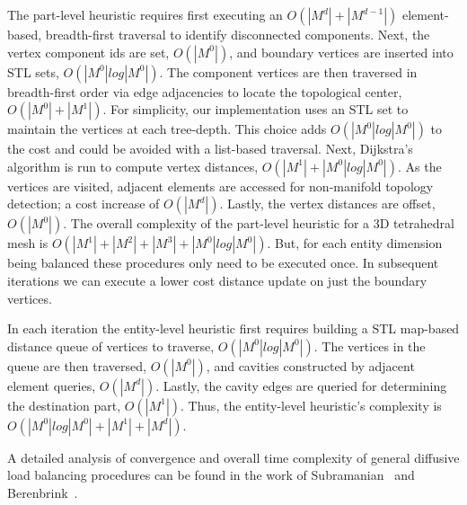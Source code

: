 The part-level heuristic requires first executing an $O(|M^d|+|M^{d-1}|)$
element-based, breadth-first traversal to identify disconnected components.
Next, the vertex component ids are set, $O(|M^0|)$, and boundary vertices
are inserted into STL sets, $O(|M^0|log|M^0|)$.
The component vertices are then traversed in breadth-first order via edge
adjacencies to locate the topological center, $O(|M^0|+|M^{1}|)$.
For simplicity, our implementation uses an STL set to maintain the vertices at
each tree-depth.
This choice adds $O(|M^0|log|M^0|)$ to the cost and could be avoided with a
list-based traversal.
Next, Dijkstra's algorithm is run to compute vertex distances,
$O(|M^1|+|M^0|log|M^0|)$.
As the vertices are visited, adjacent elements are accessed for non-manifold
topology detection; a cost increase of $O(|M^d|)$.
Lastly, the vertex distances are offset, $O(|M^0|)$.
The overall complexity of the part-level heuristic for a 3D tetrahedral mesh is
$O(|M^1| + |M^2| + |M^3| + |M^0|log|M^0|)$.
But, for each entity dimension being balanced these procedures only need to be
executed once.
In subsequent iterations we can execute a lower cost distance update on just the
boundary vertices.

In each iteration the entity-level heuristic first requires building a STL
map-based distance queue of vertices to traverse, $O(|M^0|log|M^0|)$.
The vertices in the queue are then traversed, $O(|M^0|)$, and cavities
constructed by adjacent element queries, $O(|M^d|)$.
Lastly, the cavity edges are queried for determining the destination part,
$O(|M^1|)$.
Thus, the entity-level heuristic's complexity is
$O(|M^0|log|M^0| + |M^1| + |M^d|)$.

A detailed analysis of convergence and overall time complexity of general
diffusive load balancing procedures can be found in the work of
Subramanian~\cite{subramanian1994analysis} and Berenbrink~\cite{berenbrink2009}.
